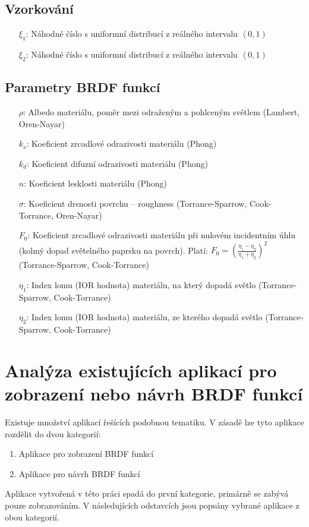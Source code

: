 \documentclass[czech,master]{diploma}
\newcommand{\intervalco}[2]{\left<{{#1},{#2}}\right)}
\newcommand{\randU}{\xi_{1}}
\newcommand{\randV}{\xi_{2}}
\newcommand{\alb}{\rho}
\newcommand{\rough}{\sigma}
\newcommand{\Fzero}{F_0}
\begin{document}
\section{Vzorkování}

\begin{itemize}
  \item[\(\randU\):] Náhodné číslo s uniformní distribucí z reálného intervalu \(\intervalco{0}{1}\)
  \item[\(\randV\):] Náhodné číslo s uniformní distribucí z reálného intervalu \(\intervalco{0}{1}\)
\end{itemize}

\section{Parametry BRDF funkcí}

\begin{itemize}
  \item[\(\alb\):] Albedo materiálu, poměr mezi odraženým a pohlceným světlem (Lambert, Oren-Nayar)
  \item[\(k_s\):] Koeficient zrcadlové odrazivosti materiálu (Phong)
  \item[\(k_d\):] Koeficient difuzní odrazivosti materiálu (Phong)
  \item[\(n\):] Koeficient lesklosti materiálu (Phong)
  \item[\(\rough\):] Koeficient drsnosti povrchu -- roughness (Torrance-Sparrow, Cook-Torrance, Oren-Nayar)
  \item[\(\Fzero\):] Koeficient zrcadlové odrazivosti materiálu při nulovém incidentním úhlu (kolmý dopad světelného paprsku na povrch). Platí: \(\Fzero = {\left(\frac{\eta_1-\eta_2}{\eta_1+\eta_2}\right)}^2\) (Torrance-Sparrow, Cook-Torrance)
  \item[\(\eta_1\):] Index lomu (IOR hodnota) materiálu, na který dopadá světlo (Torrance-Sparrow, Cook-Torrance)
  \item[\(\eta_2\):] Index lomu (IOR hodnota) materiálu, ze kterého dopadá světlo (Torrance-Sparrow, Cook-Torrance)
\end{itemize}

\clearpage
\chapter{Analýza existujících aplikací pro zobrazení nebo návrh BRDF funkcí}
Existuje množství aplikací řešících podobnou tematiku. V zásadě lze tyto aplikace rozdělit do dvou kategorií:
\begin{enumerate}
  \item Aplikace pro zobrazení BRDF funkcí
  \item Aplikace pro návrh BRDF funkcí
\end{enumerate}
Aplikace vytvořená v této práci spadá do první kategorie, primárně se zabývá pouze zobrazováním. V následujících odstavcích jsou popsány vybrané aplikace z obou kategorií.
\end{document}
